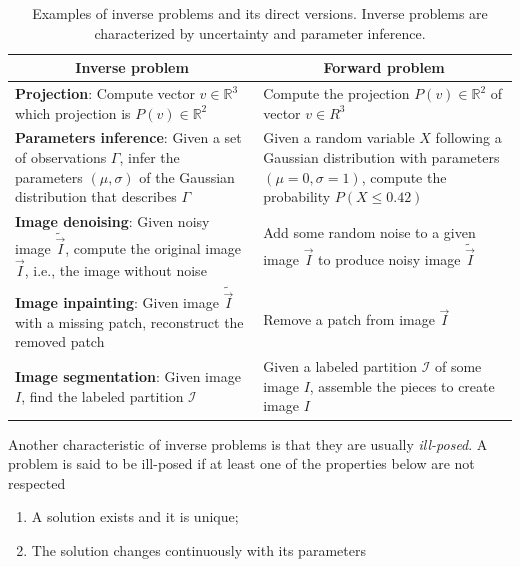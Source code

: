 \begin{table}
\renewcommand{\arraystretch}{1.5}
\footnotesize
\begin{tabular}{|m{7cm}|m{7cm}|}
\hline
\multicolumn{1}{|c|}{\textbf{Inverse problem}} & \multicolumn{1}{c|}{\textbf{Forward problem}} \\
\hline
\textbf{Projection}: Compute vector $v \in \mathbb{R}^3$ which projection is $P(v) \in \mathbb{R}^2$ & Compute the projection $P(v) \in \mathbb{R}^2$ of vector $v \in R^3$\\
\hline
\textbf{Parameters inference}: Given a set of observations $\Gamma$, infer the parameters $(\mu,\sigma)$ of the Gaussian distribution that describes $\Gamma$ & Given a random variable $X$ following a Gaussian distribution with parameters $(\mu=0,\sigma=1)$, compute the probability $P(X \leq 0.42)$\\
\hline
\textbf{Image denoising}: Given noisy image $\widetilde{\vec{I}}$, compute the original image $\vec{I}$, i.e., the image without noise & Add some random noise to a given image $\vec{I}$ to produce noisy image $\widetilde{\vec{I}}$\\
\hline
\textbf{Image inpainting}: Given image $\widetilde{\vec{I}}$ with a missing patch, reconstruct the removed patch & Remove a patch from image $\vec{I}$ \\
\hline
\textbf{Image segmentation}: Given image $I$, find the labeled partition $\mathcal{I}$ & Given a labeled partition $\mathcal{I}$ of some image $I$, assemble the pieces to create image $I$\\
\hline
\end{tabular}
\caption{Examples of inverse problems and its direct versions. Inverse problems are characterized by uncertainty and parameter inference. }
\label{ch1:tab:inverse-problems-list}
\end{table}


Another characteristic of inverse problems is that they are usually \emph{ill-posed}. A problem is said to be ill-posed if at least one of the properties below are not respected

\begin{enumerate}
\item{A solution exists and it is unique;}
\item{The solution changes continuously with its parameters}
\end{enumerate}




